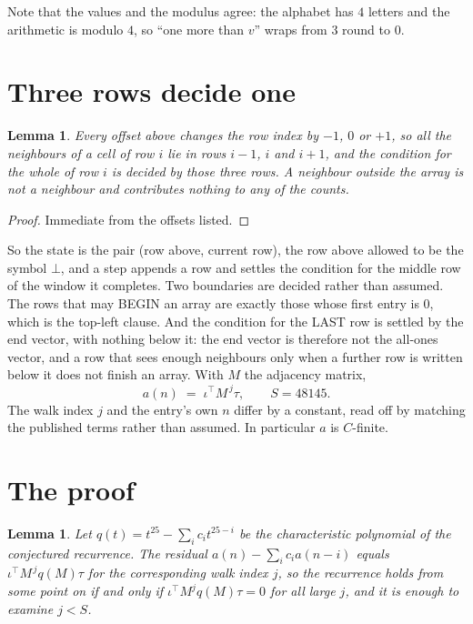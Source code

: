 \documentclass[11pt,a4paper]{article}
\theoremstyle{plain}
\newtheorem{lemma}[theorem]{Lemma}
\theoremstyle{definition}
\begin{document}
Note that the values and the modulus agree: the alphabet has $4$ letters and the arithmetic
is modulo $4$, so ``one more than $v$'' wraps from $3$ round to $0$.

\section{Three rows decide one}

\begin{lemma}\label{lem:win}
Every offset above changes the row index by $-1$, $0$ or $+1$, so all the neighbours of a cell
of row $i$ lie in rows $i-1$, $i$ and $i+1$, and the condition for the whole of row $i$ is
decided by those three rows. A neighbour outside the array is not a neighbour and contributes
nothing to any of the counts.
\end{lemma}

\begin{proof}
Immediate from the offsets listed.
\end{proof}

So the state is the pair (row above, current row), the row above allowed to be the symbol
$\bot$, and a step appends a row and settles the condition for the middle row of the window it
completes. Two boundaries are decided rather than assumed. The rows that may BEGIN an array are
exactly those whose first entry is $0$, which is the top-left clause. And the condition for the
LAST row is settled by the end vector, with nothing below it: the end vector is therefore not
the all-ones vector, and a row that sees enough neighbours only when a further row is written
below it does not finish an array. With $M$ the adjacency matrix,
\[
a(n)\;=\;\iota^{\!\top}M^{\,j}\tau ,\qquad S=48145.
\]
The walk index $j$ and the entry's own $n$ differ by a constant, read off by matching the
published terms rather than assumed. In particular $a$ is $C$-finite.

\section{The proof}

\begin{lemma}\label{lem:crit}
Let $q(t)=t^{25}-\sum_i c_it^{25-i}$ be the characteristic polynomial of the
conjectured recurrence. The residual $a(n)-\sum_ic_ia(n-i)$ equals
$\iota^{\!\top}M^{\,j}q(M)\tau$ for the corresponding walk index $j$, so the recurrence
holds from some point on if and only if $\iota^{\!\top}M^{j}q(M)\tau=0$ for all large $j$,
and it is enough to examine $j<S$.
\end{lemma}
\end{document}
